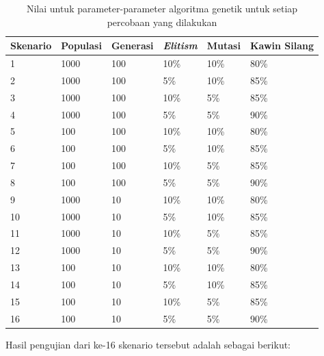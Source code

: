 \begin{table}
\centering
\captionsetup{justification=centering}
\caption[Nilai untuk parameter-parameter algoritma genetik untuk setiap percobaan yang dilakukan]{Nilai untuk parameter-parameter algoritma genetik untuk setiap percobaan yang dilakukan}
\begin{tabular}{| l | l | l | l | l | l |}
\hline
Skenario & Populasi & Generasi & \textit{Elitism} & Mutasi & Kawin Silang \\
\hline \hline
1 & 1000 & 100 & 10\% & 10\% & 80\% \\
\hline
2 & 1000 & 100 & 5\% & 10\% & 85\% \\
\hline
3 & 1000 & 100 & 10\% & 5\% & 85\% \\
\hline
4 & 1000 & 100 & 5\% & 5\% & 90\% \\
\hline
5 & 100 & 100 & 10\% & 10\% & 80\% \\
\hline
6 & 100 & 100 & 5\% & 10\% & 85\% \\
\hline
7 & 100 & 100 & 10\% & 5\% & 85\% \\
\hline
8 & 100 & 100 & 5\% & 5\% & 90\% \\
\hline
9 & 1000 & 10 & 10\% & 10\% & 80\% \\
\hline
10 & 1000 & 10 & 5\% & 10\% & 85\% \\
\hline
11 & 1000 & 10 & 10\% & 5\% & 85\% \\
\hline
12 & 1000 & 10 & 5\% & 5\% & 90\% \\
\hline
13 & 100 & 10 & 10\% & 10\% & 80\% \\
\hline
14 & 100 & 10 & 5\% & 10\% & 85\% \\
\hline
15 & 100 & 10 & 10\% & 5\% & 85\% \\
\hline
16 & 100 & 10 & 5\% & 5\% & 90\% \\
\hline
\end{tabular}
\label{tab:nilaiparameterhg}
\end{table}

Hasil pengujian dari ke-16 skenario tersebut adalah sebagai berikut:

